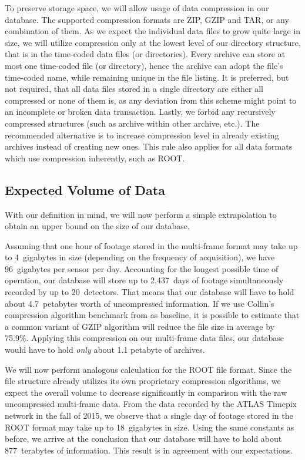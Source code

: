 
To preserve storage space, we will allow usage of data compression in our database. The supported compression formats are ZIP, GZIP and TAR, or any combination of them. As we expect the individual data files to grow quite large in size, we will utilize compression only at the lowest level of our directory structure, that is in the time-coded data files (or directories). Every archive can store at most one time-coded file (or directory), hence the archive can adopt the file's time-coded name, while remaining unique in the file listing. It is preferred, but not required, that all data files stored in a single directory are either all compressed or none of them is, as any deviation from this scheme might point to an incomplete or broken data transaction. Lastly, we forbid any recursively compressed structures (such as archive within other archive, etc.). The recommended alternative is to increase compression level in already existing archives instead of creating new ones. This rule also applies for all data formats which use compression inherently, such as ROOT.


\subsection{Expected Volume of Data}
With our definition in mind, we will now perform a simple extrapolation to obtain an upper bound on the size of our database.

Assuming that one hour of footage stored in the multi-frame format may take up to 4~gigabytes in size (depending on the frequency of acquisition), we have 96~gigabytes per sensor per day. Accounting for the longest possible time of operation, our database will store up to 2,437~days of footage simultaneously recorded by up to 20~detectors. That means that our database will have to hold about 4.7~petabytes worth of uncompressed information. If we use Collin's compression algorithm benchmark from \cite{GzipBenchmark} as baseline, it is possible to estimate that a common variant of GZIP algorithm will reduce the file size in average by 75.9\%. Applying this compression on our multi-frame data files, our database would have to hold \textit{only} about 1.1 petabyte of archives.

We will now perform analogous calculation for the ROOT file format. Since the file structure already utilizes its own proprietary compression algorithms, we expect the overall volume to decrease significantly in comparison with the raw uncompressed multi-frame data. From the data recorded by the ATLAS Timepix network in the fall of 2015, we observe that a single day of footage stored in the ROOT format may take up to 18~gigabytes in size. Using the same constants as before, we arrive at the conclusion that our database will have to hold about 877~terabytes of information. This result is in agreement with our expectations.

